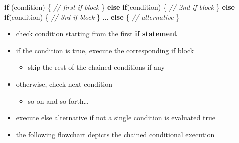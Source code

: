 \documentclass[11pt]{article}
\providecommand{\tightlist}{%
      \setlength{\itemsep}{0pt}\setlength{\parskip}{0pt}}
\newenvironment{Shaded}{}{}
\newcommand{\CommentTok}[1]{\textcolor[rgb]{0.38,0.63,0.69}{\textit{{#1}}}}
\newcommand{\NormalTok}[1]{{#1}}
\newcommand{\ControlFlowTok}[1]{\textcolor[rgb]{0.00,0.44,0.13}{\textbf{{#1}}}}
\newcommand{\OperatorTok}[1]{\textcolor[rgb]{0.40,0.40,0.40}{{#1}}}
\begin{document}
\begin{Shaded}
\begin{Highlighting}[]
    \ControlFlowTok{if} \OperatorTok{(}\NormalTok{condition}\OperatorTok{)} \OperatorTok{\{}
        \CommentTok{// first if block}
    \OperatorTok{\}}
    \ControlFlowTok{else} \ControlFlowTok{if}\OperatorTok{(}\NormalTok{condition}\OperatorTok{)} \OperatorTok{\{}
        \CommentTok{// 2nd if block}
    \OperatorTok{\}}
    \ControlFlowTok{else} \ControlFlowTok{if}\OperatorTok{(}\NormalTok{condition}\OperatorTok{)} \OperatorTok{\{}
        \CommentTok{// 3rd if block}
    \OperatorTok{\}}
    \OperatorTok{...}
    \ControlFlowTok{else} \OperatorTok{\{}
        \CommentTok{// alternative}
    \OperatorTok{\}}
\end{Highlighting}
\end{Shaded}

\begin{itemize}
\tightlist
\item
  check condition starting from the first \textbf{if statement}
\item
  if the condition is true, execute the corresponding if block

  \begin{itemize}
  \tightlist
  \item
    skip the rest of the chained conditions if any
  \end{itemize}
\item
  otherwise, check next condition

  \begin{itemize}
  \tightlist
  \item
    so on and so forth\ldots{}
  \end{itemize}
\item
  execute else alternative if not a single condition is evaluated true
\item
  the following flowchart depicts the chained conditional execution
\end{itemize}
\end{document}
